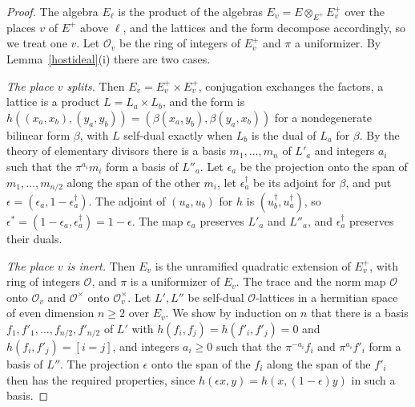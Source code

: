 \begin{proof}
The algebra $E_\ell$ is the product of the algebras $E_v=E\otimes_{E^+}E^+_v$ over the places $v$ of $E^+$ above $\ell$, and the lattices and the form decompose accordingly, so we treat one $v$. Let $\mathcal O_v$ be the ring of integers of $E^+_v$ and $\pi$ a uniformizer. By Lemma~\ref{hostideal}(i) there are two cases.

\emph{The place $v$ splits.} Then $E_v=E^+_v\times E^+_v$, conjugation exchanges the factors, a lattice is a product $L=L_a\times L_b$, and the form is $h((x_a,x_b),(y_a,y_b))=(\beta(x_a,y_b),\beta(y_a,x_b))$ for a nondegenerate bilinear form $\beta$, with $L$ self-dual exactly when $L_b$ is the dual of $L_a$ for $\beta$. By the theory of elementary divisors there is a basis $m_1,\dots,m_n$ of $L'_a$ and integers $a_i$ such that the $\pi^{a_i}m_i$ form a basis of $L''_a$. Let $\epsilon_a$ be the projection onto the span of $m_1,\dots,m_{n/2}$ along the span of the other $m_i$, let $\epsilon_a^\dagger$ be its adjoint for $\beta$, and put $\epsilon=(\epsilon_a,1-\epsilon_a^\dagger)$. The adjoint of $(u_a,u_b)$ for $h$ is $(u_b^\dagger,u_a^\dagger)$, so $\epsilon^\ast=(1-\epsilon_a,\epsilon_a^\dagger)=1-\epsilon$. The map $\epsilon_a$ preserves $L'_a$ and $L''_a$, and $\epsilon_a^\dagger$ preserves their duals.

\emph{The place $v$ is inert.} Then $E_v$ is the unramified quadratic extension of $E^+_v$, with ring of integers $\mathcal O$, and $\pi$ is a uniformizer of $E_v$. The trace and the norm map $\mathcal O$ onto $\mathcal O_v$ and $\mathcal O^\times$ onto $\mathcal O_v^\times$. Let $L',L''$ be self-dual $\mathcal O$-lattices in a hermitian space of even dimension $n\ge2$ over $E_v$. We show by induction on $n$ that there is a basis $f_1,f'_1,\dots,f_{n/2},f'_{n/2}$ of $L'$ with $h(f_i,f_j)=h(f'_i,f'_j)=0$ and $h(f_i,f'_j)=[i=j]$, and integers $a_i\ge0$ such that the $\pi^{-a_i}f_i$ and $\pi^{a_i}f'_i$ form a basis of $L''$. The projection $\epsilon$ onto the span of the $f_i$ along the span of the $f'_i$ then has the required properties, since $h(\epsilon x,y)=h(x,(1-\epsilon)y)$ in such a basis.


\end{proof}
